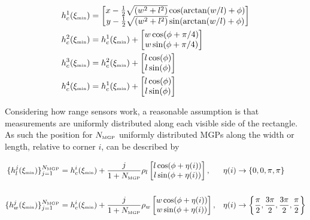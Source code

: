 \begin{equation}
    \begin{split}
        h^{1}_{c}(\xi_{\text{\tiny{min}}})
            &= 
        \begin{bmatrix}
            x-\frac{1}{2}\sqrt{(w^2 + l^2)} \cos(\arctan(w/l) + \phi) \\
            y-\frac{1}{2}\sqrt{(w^2 + l^2)} \sin(\arctan(w/l) + \phi)
        \end{bmatrix} 
        \\
        h^{2}_{c}(\xi_{\text{\tiny{min}}})
            &= 
        h^{1}_{c}(\xi_{\text{\tiny{min}}})
        + 
        \begin{bmatrix}
            w \cos(\phi +\pi/4) \\
            w \sin(\phi +\pi/4)
        \end{bmatrix}
        \\
        h^{3}_{c}(\xi_{\text{\tiny{min}}})
            &= 
        h^{2}_{c}(\xi_{\text{\tiny{min}}})
        + 
        \begin{bmatrix}
            l \cos(\phi) \\
            l \sin(\phi)
        \end{bmatrix}
        \\
        h^{4}_{c}(\xi_{\text{\tiny{min}}})
            &= 
        h^{1}_{c}(\xi_{\text{\tiny{min}}})
        + 
        \begin{bmatrix}
            l \cos(\phi) \\
            l \sin(\phi)
        \end{bmatrix}
    \end{split}
\end{equation}

Considering how range sensors work, a reasonable assumption is that measurements are uniformly distributed along each visible side of the rectangle. As such the position for $N_{\text{\tiny{MGP}}}$ uniformly distributed MGPs along the width or length, relative to corner $i$, can be described by

\begin{align}
    \{h_{l}^j(\xi_{\text{\tiny{min}}})\}_{j = 1}^{N_{\text{\tiny{MGP}}}} &= h_c^i(\xi_{\text{\tiny{min}}}) + \frac{j}{1+N_{\text{\tiny{MGP}}}}\rho_l
        \begin{bmatrix}
            l\cos(\phi + \eta(i)) \\
            l\sin(\phi + \eta(i)) 
        \end{bmatrix}, & \eta(i) &\rightarrow \{0,0,\pi,\pi\} 
    \\\nonumber 
    \\ 
    \{h_{w}^j(\xi_{\text{\tiny{min}}})\}_{j = 1}^{N_{\text{\tiny{MGP}}}} &= h_c^i(\xi_{\text{\tiny{min}}}) + \frac{j}{1+N_{\text{\tiny{MGP}}}}\rho_w
    \begin{bmatrix}
        w\cos(\phi + \eta(i)) \\
        w\sin(\phi + \eta(i)) 
    \end{bmatrix}, & \eta(i) &\rightarrow \left\{\frac{\pi}{2},\frac{3\pi}{2},\frac{3\pi}{2},\frac{\pi}{2}\right\} 
\end{align}

